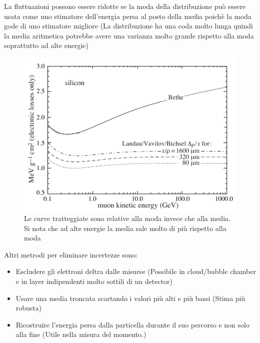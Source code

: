 La fluttuazioni possono essere ridotte se la moda della distribuzione può essere usata come uno stimatore dell'energia persa al posto della media poichè la moda gode di uno stimatore migliore (La distribuzione ha una coda molto lunga quindi la media aritmetica potrebbe avere una varianza molto grande rispetto alla moda soprattutto ad alte energie)

\hspace{-30pt}
\begin{minipage}{0.52\textwidth}
    \begin{figure}[H]
        \centering
        \includegraphics[width=\textwidth,frame]{Chapters/images/Interazione_radiazione_materia/image-20220217014236788.png}
        \captionsetup{width=\textwidth}
        \caption{Le curve tratteggiate sono relative alla moda invece che alla media. Si nota che ad alte energie la media sale molto di più rispetto alla moda}
        \label{fig:landaumode}
    \end{figure}
\end{minipage} \hfill
\begin{minipage}{0.48\textwidth}
    Altri metrodi per eliminare incertezze sono:
\begin{itemize}
    \item Escludere gli elettroni deltra dalle misurse (Possibile in cloud/bubble chamber e in layer indipendenti molto sottili di un detector)
    \item Usare una media troncata scartando i valori più alti e più bassi (Stima più robusta)
    \item Ricostruire l'energia persa dalla particella durante il suo percorso e non solo alla fine (Utile nella misura del momento.)
\end{itemize}


\end{minipage}

